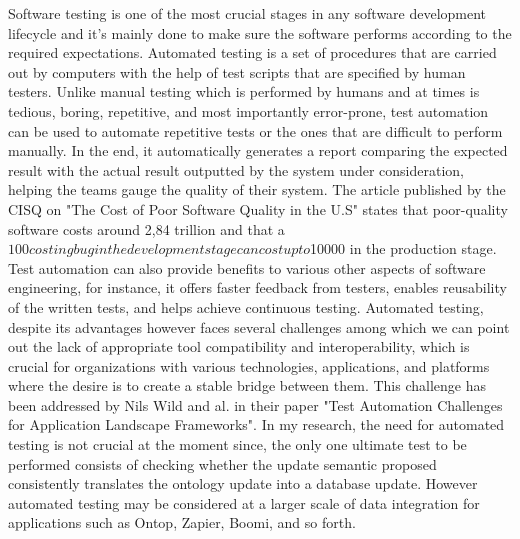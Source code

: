 \documentclass{article}
\begin{document}
Software testing is one of the most crucial stages in any software development lifecycle and it's mainly done to make sure the software performs according to the required expectations. Automated testing is a set of procedures that are carried out by computers with the help of test scripts that are specified by human testers. Unlike manual testing which is performed by humans and at times is tedious, boring, repetitive, and most importantly error-prone, test automation can be used to automate repetitive tests or the ones that are difficult to perform manually. In the end, it automatically generates a report comparing the expected result with the actual result outputted by the system under consideration, helping the teams gauge the quality of their system. The article published by the CISQ on "The Cost of Poor Software Quality in the U.S" states that poor-quality software costs around 2,84 trillion and that a $100 costing bug in the development stage can cost up to $10000 in the production stage. Test automation can also provide benefits to various other aspects of software engineering, for instance, it offers faster feedback from testers, enables reusability of the written tests, and helps achieve continuous testing. Automated testing, despite its advantages however faces several challenges among which we can point out the lack of appropriate tool compatibility and interoperability, which is crucial for organizations with various technologies, applications, and platforms where the desire is to create a stable bridge between them. This challenge has been addressed by Nils Wild and al. in their paper "Test Automation Challenges for Application Landscape Frameworks".  In my research, the need for automated testing is not crucial at the moment since, the only one ultimate test to be performed consists of checking whether the update semantic proposed consistently translates the ontology update into a database update. However automated testing may be considered at a larger scale of data integration for applications such as Ontop, Zapier, Boomi, and so forth. \newline
\end{document}
